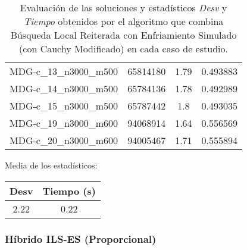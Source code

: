\documentclass{article}
\begin{document}
\begin{table}[H]
\begin{tabular}{|cccc|}
		MDG-c\_13\_n3000\_m500 & 65814180 & 1.79 & 0.493883\\
		MDG-c\_14\_n3000\_m500 & 65784136 & 1.78 & 0.492989\\
		MDG-c\_15\_n3000\_m500 & 65787442 & 1.8 & 0.493035\\
		MDG-c\_19\_n3000\_m600 & 94068914 & 1.64 & 0.556569\\
		MDG-c\_20\_n3000\_m600 & 94005467 & 1.71 & 0.555894\\
		\hline
	\end{tabular}
	\caption{Evaluación de las soluciones y estadísticos \emph{Desv} y \emph{Tiempo} obtenidos por el algoritmo que combina
		Búsqueda Local Reiterada con Enfriamiento Simulado (con Cauchy Modificado) en cada caso de estudio.}
	\label{tab:ils-es}
\end{table}

Media de los estadísticos:
\begin{table}[H]
	\centering
	\begin{tabular}{|cc|}
		\hline
		Desv & Tiempo (s)\\ \hline
		2.22 & 0.22 \\
		\hline
	\end{tabular}
\end{table}

\pagebreak

\subsubsection*{Híbrido ILS-ES (Proporcional)}
\end{document}
